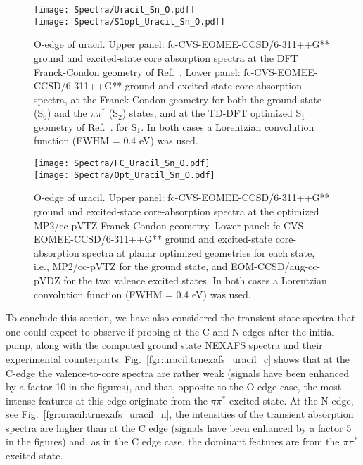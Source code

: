 \documentclass[journal=jctcce,manuscript=article]{achemso}
\begin{document}
\begin{figure}[H]
\texttt{[image: Spectra/Uracil\_Sn\_O.pdf]}\\
\vspace{-0.2cm}\texttt{[image: Spectra/S1opt\_Uracil\_Sn\_O.pdf]}
\caption{O-edge of uracil. Upper panel: fc-CVS-EOMEE-CCSD/6-311++G** ground and excited-state core absorption spectra at the DFT Franck-Condon geometry of 
Ref.~.
Lower panel: fc-CVS-EOMEE-CCSD/6-311++G** ground and excited-state core-absorption spectra, at the Franck-Condon geometry for both the ground state (S$_0$) and the $\pi\pi^*$ (S$_2$) states, and at the TD-DFT optimized S$_1$ geometry of 
Ref.~.
for S$_1$. 
In both cases a Lorentzian convolution function (FWHM = 0.4 eV) was used.
\label{fgr:uracil:trnexafs_uracil_o:DFT}}
\end{figure}

\begin{figure}[H]
\texttt{[image: Spectra/FC\_Uracil\_Sn\_O.pdf]}\\
\texttt{[image: Spectra/Opt\_Uracil\_Sn\_O.pdf]}
\caption{O-edge of uracil. 
Upper panel: fc-CVS-EOMEE-CCSD/6-311++G** ground and excited-state core-absorption spectra at the optimized MP2/cc-pVTZ Franck-Condon geometry. 
Lower panel: fc-CVS-EOMEE-CCSD/6-311++G** ground and excited-state core-absorption spectra at planar optimized geometries for each state, i.e., MP2/cc-pVTZ for the ground state, and EOM-CCSD/aug-cc-pVDZ for the two valence excited states. In both cases a Lorentzian convolution function (FWHM = 0.4 eV) was used.
\label{fgr:uracil:trnexafs_uracil_o:MP2CCSD}}
\end{figure}


To conclude this section, we have also considered the transient state spectra that one could expect to observe if probing at the C and N edges after the initial pump, along with the computed ground state NEXAFS spectra and their experimental counterparts.  
Fig.~\ref{fgr:uracil:trnexafs_uracil_c} shows that at the C-edge the valence-to-core spectra
are rather weak (signals have been enhanced by a factor 10 in the figures),
and that, opposite to the O-edge case, 
the most intense features at this edge originate from the $\pi\pi^*$ excited state.
At the N-edge, see Fig.~\ref{fgr:uracil:trnexafs_uracil_n},
the intensities of the transient absorption spectra are higher than
at the C edge (signals have been enhanced by a factor 5 in the figures)
and, as in the C edge case, the dominant features are from 
the $\pi\pi^*$ excited state. 
\end{document}
